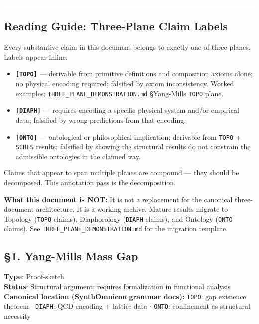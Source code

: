 \documentclass[12pt,a4paper]{article}
\newcommand{\pilcrow}{\S}
\begin{document}
\begin{center}
\rule{0.5\textwidth}{0.4pt}
\end{center}

\subsection{Reading Guide: Three-Plane Claim Labels}

Every substantive claim in this document belongs to exactly one of three planes. Labels appear inline:

\begin{itemize}
    \item \textbf{\texttt{{[}TOPO{]}}} --- derivable from primitive definitions and composition axioms alone; no physical encoding required; falsified by axiom inconsistency. Worked examples: \texttt{THREE\_PLANE\_DEMONSTRATION.md} \pilcrow{}Yang-Mills \texttt{TOPO} plane.
    \item \textbf{\texttt{{[}DIAPH{]}}} --- requires encoding a specific physical system and/or empirical data; falsified by wrong predictions from that encoding.
    \item \textbf{\texttt{{[}ONTO{]}}} --- ontological or philosophical implication; derivable from \texttt{TOPO} + \texttt{SCHES} results; falsified by showing the structural results do not constrain the admissible ontologies in the claimed way.
\end{itemize}

Claims that appear to span multiple planes are compound --- they should be decomposed. This annotation pass is the decomposition.

\textbf{What this document is NOT:} It is not a replacement for the canonical three-document architecture. It is a working archive. Mature results migrate to Topology (\texttt{TOPO} claims), Diaphorology (\texttt{DIAPH} claims), and Ontology (\texttt{ONTO} claims). See \texttt{THREE\_PLANE\_DEMONSTRATION.md} for the migration template.

\subsection{\pilcrow{}1. Yang-Mills Mass Gap}

\textbf{Type}: Proof-sketch   \\
\textbf{Status}: Structural argument; requires formalization in functional analysis   \\
\textbf{Canonical location (SynthOmnicon grammar docs):} \texttt{TOPO}: gap existence theorem $\cdot$ \texttt{DIAPH}: QCD encoding + lattice data $\cdot$ \texttt{ONTO}: confinement as structural necessity
\end{document}
